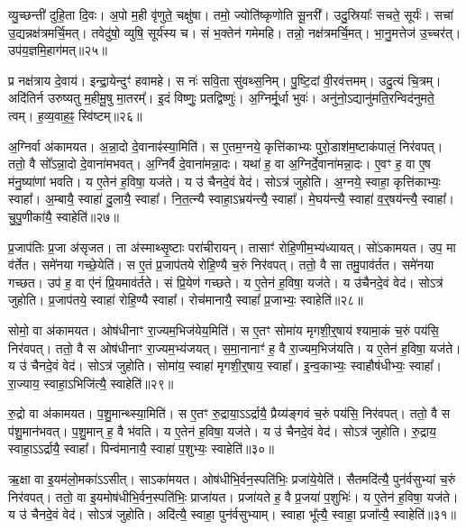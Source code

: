 व्यु॒च्छन्ती॑ दुहि॒ता दि॒वः।
अ॒पो म॒ही वृ॑णुते॒ चक्षु॑षा।
तमो॒ ज्योति॑ष्कृणोति सू॒नरी᳚।
उदु॒स्रियाः᳚ सचते॒ सूर्यः॑।
सचा॑ उ॒द्यन्नक्ष॑त्रमर्चि॒मत्।
तवेदु॑षो॒ व्युषि॒ सूर्य॑स्य च।
सं भ॒क्तेन॑ गमेमहि।
तन्नो॒ नक्ष॑त्रमर्चि॒मत्।
भा॒नु॒मत्तेज॑ उ॒च्चर॑त्।
उप॑य॒ज्ञमि॒हाग॑मत्॥२५॥\ip

प्र नक्ष॑त्राय दे॒वाय॑।
इन्द्रा॒येन्दुꣳ॑ हवामहे।
स नः॑ सवि॒ता सु॑वथ्स॒निम्।
पु॒ष्टि॒दां वी॒रव॑त्तमम्।
उदु॒त्यं चि॒त्रम्।
अदि॑तिर्न उरुष्यतु म॒हीमू॒षु मा॒तरम्᳚।
इ॒दं विष्णुः॒ प्रतद्विष्णुः॑।
अ॒ग्निर्मू॒र्धा भुवः॑।
अनु॑नो॒\-ऽद्यानु॑मति॒रन्विद॑नुमते॒ त्वम्।
ह॒व्य॒वाह॒ꣴ॒ स्वि॑ष्टम्॥२६॥\ip\anuvakamend[आ॒य॒त्य॑गम॒थ्स्वि॑ष्टम्]

अ॒ग्निर्वा अ॑कामयत।
अ॒न्ना॒दो दे॒वानाꣴ॑स्या॒मिति॑।
स ए॒तम॒ग्नये॒ कृत्ति॑काभ्यः पुरो॒डाश॑म॒ष्टा\-क॑पालं॒ निर॑वपत्।
ततो॒ वै सो᳚\-ऽन्ना॒दो दे॒वाना॑मभवत्।
अ॒ग्निर्वै दे॒वाना॑मन्ना॒दः।
यथा॑ ह॒ वा अ॒ग्निर्दे॒वाना॑मन्ना॒दः।
ए॒वꣳ ह॒ वा ए॒ष म॑नु॒ष्या॑णां भवति।
य ए॒तेन॑ ह॒विषा॒ यज॑ते।
य उ॑ चैनदे॒वं वेद॑।
सोऽत्र॑ जुहोति।
अ॒ग्नये॒ स्वाहा॒ कृत्ति॑काभ्यः॒ स्वाहा᳚।
अ॒म्बायै॒ स्वाहा॑ दु॒लायै॒ स्वाहा᳚।
नि॒त॒त्न्यै स्वाहा॒\-ऽभ्रय॑न्त्यै॒ स्वाहा᳚।
मे॒घय॑न्त्यै॒ स्वाहा॑ व॒र्॒षय॑न्त्यै॒ स्वाहा᳚।
चु॒पु॒णीका॑यै॒ स्वाहेति॑॥२७॥\ip

प्र॒जा\-प॑तिः प्र॒जा अ॑\-सृजत।
ता अ॑स्माथ्सृ॒ष्टाः परा॑चीरायन्।
तासाꣳ॑ रोहि॒णीम॒भ्य॑ध्यायत्।
सो॑ऽकामयत।
उप॒ मा व॑र्तेत।
समे॑नया गच्छे॒येति॑।
स ए॒तं प्र॒जा\-प॑तये रोहि॒ण्यै च॒रुं निर॑वपत्।
ततो॒ वै सा तमु॒पाव॑र्तत।
समे॑नया गच्छत।
उप॑ ह॒ वा ए॑नं प्रि॒यमाव॑र्तते।
सं प्रि॒येण॑ गच्छते।
य ए॒तेन॑ ह॒विषा॒ यज॑ते।
य उ॑चैनदे॒वं वेद॑।
सोऽत्र॑ जुहोति।
प्र॒जा\-प॑तये॒ स्वाहा॑ रोहि॒ण्यै स्वाहा᳚।
रोच॑मानायै॒ स्वाहा᳚ प्र॒जाभ्यः॒ स्वाहेति॑॥२८॥\ip

सोमो॒ वा अ॑कामयत।
ओष॑धीनाꣳ रा॒ज्यम॒भिज॑येय॒मिति॑।
स ए॒तꣳ सोमा॑य मृगशी॒र्॒षाय॑ श्यामा॒कं च॒रुं पय॑सि॒ निर॑वपत्।
ततो॒ वै स ओष॑धीनाꣳ रा॒ज्यम॒भ्य॑जयत्।
स॒मा॒नानाꣳ॑ ह॒ वै रा॒ज्यम॒भि\-ज॑यति।
य ए॒तेन॑ ह॒विषा॒ यज॑ते।
य उ॑ चैनदे॒वं वेद॑।
सोऽत्र॑ जुहोति।
सोमा॑य॒ स्वाहा॑ मृगशी॒र्‌॒\mbox{}षाय॒ स्वाहा᳚।
इ॒न्व॒काभ्यः॒ स्वाहौष॑धीभ्यः॒ स्वाहा᳚।
रा॒ज्याय॒ स्वाहा॒\-ऽभिजि॑त्यै॒ स्वाहेति॑॥२९॥\ip

रु॒द्रो वा अ॑कामयत।
प॒शु॒मान्थ्स्या॒मिति॑।
स ए॒तꣳ रु॒द्राया॒ऽऽर्द्रायै॒ प्रैय्य॑ङ्गवं च॒रुं पय॑सि॒ निर॑वपत्।
ततो॒ वै स प॑शु॒मान॑भवत्।
प॒शु॒मान् ह॒ वै भ॑वति।
य ए॒तेन॑ ह॒विषा॒ यज॑ते।
य उ॑ चैनदे॒वं वेद॑।
सोऽत्र॑ जुहोति।
रु॒द्राय॒ स्वाहा॒\-ऽऽर्द्रायै॒ स्वाहा᳚।
पिन्व॑मानायै॒ स्वाहा॑ प॒शुभ्यः॒ स्वाहेति॑॥३०॥\ip

ऋ॒क्षा वा इ॒यम॑लो॒मका॑\-ऽऽसीत्।
साऽका॑मयत।
ओष॑धीभि॒र्वन॒\-स्पति॑भिः॒ प्रजा॑ये॒येति॑।
सैतमदि॑त्यै॒ पुन॑र्वसुभ्यां च॒रुं निर॑वपत्।
ततो॒ वा इ॒यमोष॑धीभि॒र्वन॒स्पति॑भिः॒ प्राजा॑यत।
प्रजा॑यते ह॒ वै प्र॒जया॑ प॒शुभिः॑।
य ए॒तेन॑ ह॒विषा॒ यज॑ते।
य उ॑ चैनदे॒वं वेद॑।
सोऽत्र॑ जुहोति।
अदि॑त्यै॒ स्वाहा॒ पुन॑र्वसुभ्याम्।
स्वाहा भू᳚त्यै॒ स्वाहा॒ प्रजा᳚त्यै॒ स्वाहेति॑॥३१॥\ip

